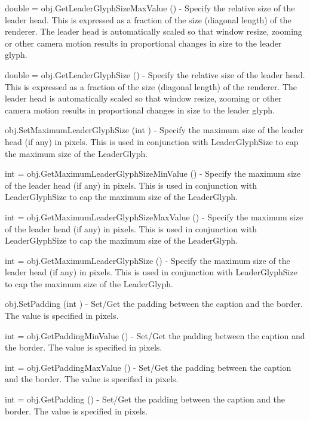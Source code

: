 \begin{DoxyItemize}
\item {\ttfamily double = obj.\-Get\-Leader\-Glyph\-Size\-Max\-Value ()} -\/ Specify the relative size of the leader head. This is expressed as a fraction of the size (diagonal length) of the renderer. The leader head is automatically scaled so that window resize, zooming or other camera motion results in proportional changes in size to the leader glyph.  
\item {\ttfamily double = obj.\-Get\-Leader\-Glyph\-Size ()} -\/ Specify the relative size of the leader head. This is expressed as a fraction of the size (diagonal length) of the renderer. The leader head is automatically scaled so that window resize, zooming or other camera motion results in proportional changes in size to the leader glyph.  
\item {\ttfamily obj.\-Set\-Maximum\-Leader\-Glyph\-Size (int )} -\/ Specify the maximum size of the leader head (if any) in pixels. This is used in conjunction with Leader\-Glyph\-Size to cap the maximum size of the Leader\-Glyph.  
\item {\ttfamily int = obj.\-Get\-Maximum\-Leader\-Glyph\-Size\-Min\-Value ()} -\/ Specify the maximum size of the leader head (if any) in pixels. This is used in conjunction with Leader\-Glyph\-Size to cap the maximum size of the Leader\-Glyph.  
\item {\ttfamily int = obj.\-Get\-Maximum\-Leader\-Glyph\-Size\-Max\-Value ()} -\/ Specify the maximum size of the leader head (if any) in pixels. This is used in conjunction with Leader\-Glyph\-Size to cap the maximum size of the Leader\-Glyph.  
\item {\ttfamily int = obj.\-Get\-Maximum\-Leader\-Glyph\-Size ()} -\/ Specify the maximum size of the leader head (if any) in pixels. This is used in conjunction with Leader\-Glyph\-Size to cap the maximum size of the Leader\-Glyph.  
\item {\ttfamily obj.\-Set\-Padding (int )} -\/ Set/\-Get the padding between the caption and the border. The value is specified in pixels.  
\item {\ttfamily int = obj.\-Get\-Padding\-Min\-Value ()} -\/ Set/\-Get the padding between the caption and the border. The value is specified in pixels.  
\item {\ttfamily int = obj.\-Get\-Padding\-Max\-Value ()} -\/ Set/\-Get the padding between the caption and the border. The value is specified in pixels.  
\item {\ttfamily int = obj.\-Get\-Padding ()} -\/ Set/\-Get the padding between the caption and the border. The value is specified in pixels.  

\end{DoxyItemize}
